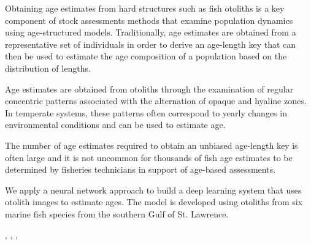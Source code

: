Obtaining age estimates from hard structures such as fish otoliths is a key component of stock assessments methods that examine population dynamics using age-structured models.
Traditionally, age estimates are obtained from a representative set of individuals in order to derive an age-length key that can then be used to estimate the age composition of a population based on the distribution of lengths.

Age estimates are obtained from otoliths through the examination of regular concentric patterns associated with the alternation of opaque and hyaline zones.
In temperate systems, these patterns often correspond to yearly changes in environmental conditions and can be used to estimate age.

The number of age estimates required to obtain an unbiased age-length key is often large and it is not uncommon for thousands of fish age estimates to be determined by fisheries technicians in support of age-based assessments.

We apply a neural network approach to build a deep learning system that uses otolith images to estimate ages.
The model is developed using otoliths from six marine fish species from the southern Gulf of St. Lawrence.


\cite{Moen-etal-2018}, \cite{Polacek-2023}, \cite{Politikos-atal-2021}, \cite{Sigurdardottir-2023}

\cite{Bojesen-etal-2024-annotation-deep}

\cite{Martinsen-etal-2022}

\cite{Moen-etal-2023}

\cite{Benson-etal-2023}

\cite{Chamberlin-etal-2026}

